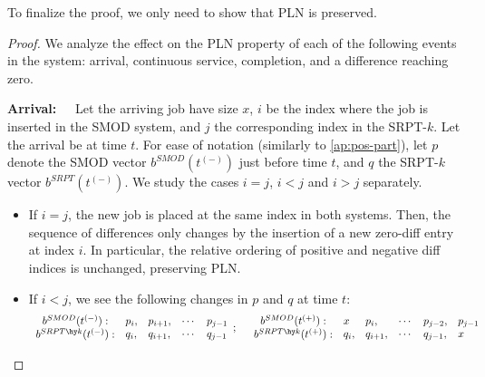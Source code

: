 \documentclass[acmsmall]{acmart}
\begin{document}
To finalize the proof, we only need to show that PLN is preserved. 

\begin{proof}
We analyze the effect on the PLN property of each of the following events in the system: arrival, continuous service, completion, and a difference reaching zero.

    \textbf{Arrival:~~} Let the arriving job have size $x$, $i$ be the index where the job is inserted in the SMOD system, and $j$ the corresponding index in the SRPT-$k$.
    Let the arrival be at time $t$. For ease of notation (similarly to \cref{ap:pos-part}), let $p$ denote the SMOD vector $b^{SMOD}(t^{(-)})$ just before time $t$, and $q$ the SRPT-$k$ vector $b^{SRPT}(t^{(-)})$. We study the cases $i=j$, $i<j$ and $i>j$ separately.
    \begin{itemize}
        \item If $i = j$, the new job is placed at the same index in both systems. Then, the sequence of differences only changes by the insertion of a new zero-diff entry at index $i$. In particular, the relative ordering of positive and negative diff indices is unchanged, preserving PLN.
    

        \item If $i < j$, we see the following changes in $p$ and $q$ at time $t$:
        \begin{align*}
            \begin{array}{c}
                b^{SMOD}(t^{(-)}): \\ b^{SRPT\hy k}(t^{(-)}):
            \end{array}
            \begin{array}{llll}
                p_i, & p_{i+1}, & \cdots & p_{j-1} \\
                q_i, & q_{i+1}, & \cdots & q_{j-1} \\
            \end{array}
            ;\quad 
            \begin{array}{c}
                b^{SMOD}(t^{(+)}): \\ b^{SRPT\hy k}(t^{(+)}):
            \end{array}
            \begin{array}{lllll}
                x & p_i, & \cdots & p_{j-2}, & p_{j-1} \\
                q_i, & q_{i+1}, & \cdots & q_{j-1}, & x \\
            \end{array}
        \end{align*}
    

\end{itemize}
\end{proof}
\end{document}
